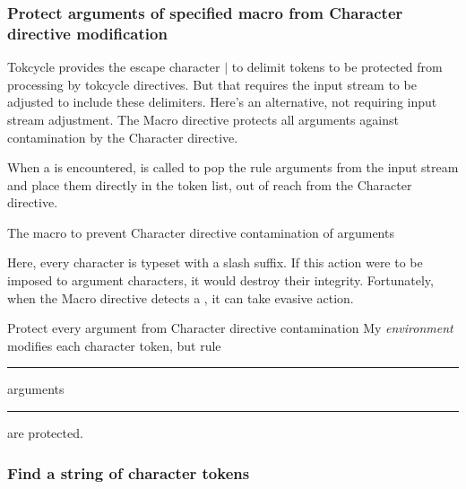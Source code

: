 \documentclass[10pt]{article}
\begin{document}
\endgroup


\subsubsection{Protect arguments of specified macro from Character
   directive modification}

\begingroup
Tokcycle provides the escape character $|$ to delimit tokens to be protected
  from processing by tokcycle directives.  
But that requires the input stream to be adjusted to include these delimiters.  
Here's an alternative, not requiring input stream adjustment.  
The Macro directive protects all  arguments against contamination 
  by the Character directive.

\medskip
When a  is encountered,  is called
  to pop the rule arguments from the input stream and place them directly
  in the  token list, out of reach from the Character directive.


\begin{exampleC}[]{The  macro to prevent Character directive
  contamination of arguments}
\newcommand\protectruleargs[1]{\ifx\rule#1%
  \tcpeek\zA
  \ifx[\zA\tcpopuntil]\opt
  \addcytoks[1]{\opt}\fi%
  \tcpopliteral\ArgA%
  \addcytoks[1]{\ArgA}%
  \tcpopliteral\ArgB%
  \addcytoks[1]{\ArgB}%
  \fi
}
\end{exampleC}

Here, every character is typeset with a slash suffix.
If this action were to be imposed to  argument characters, 
  it would destroy their integrity.
Fortunately, when the Macro directive detects a , it can
  take evasive action.

\begin{exampleA}[lefthand width=9.1cm]{Protect every  argument
  from Character directive contamination}
\resettokcycle
\Characterdirective{\addcytoks{#1\textup{/}\allowbreak}}
\tokencyclexpress 
My \textit{environment} modifies each character token, but rule
  \rule[-4pt]{1.5ex}{1.5ex} arguments \rule{2ex}{3pt} are protected.
\endtokencyclexpress
\end{exampleA}
\endgroup


\begingroup

\subsubsection{Find a string of character tokens}
\end{document}
